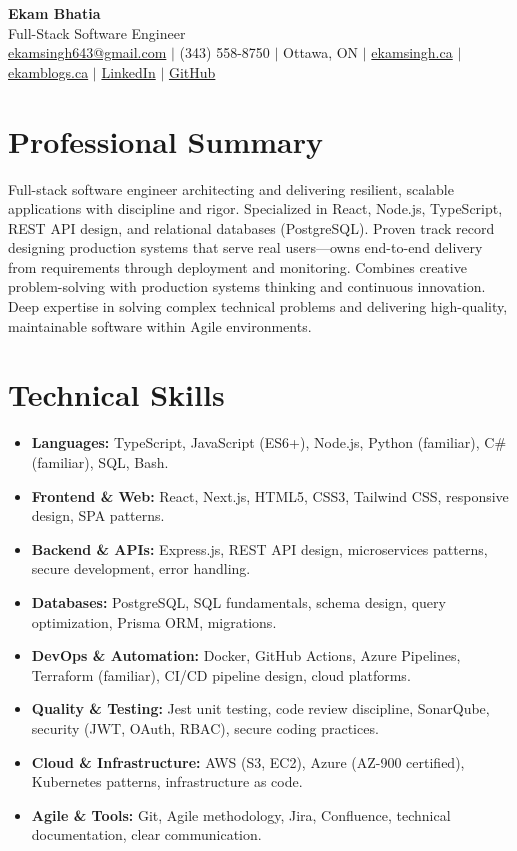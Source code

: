 \documentclass[11pt,a4paper]{article}
\begin{document}
\begin{center}
    {\LARGE \textbf{Ekam Bhatia}} \\
    \vspace{2pt}
    {\normalsize Full-Stack Software Engineer } \\
    \vspace{4pt}
    \small
    \href{mailto:ekamsingh643@gmail.com}{ekamsingh643@gmail.com} $|$
    (343) 558-8750 $|$ Ottawa, ON $|$
    \href{https://www.ekamsingh.ca}{ekamsingh.ca} $|$
    \href{https://www.ekamblogs.ca}{ekamblogs.ca} $|$
    \href{https://www.linkedin.com/in/ekam-bhatia-335840168}{LinkedIn} $|$
    \href{https://github.com/bhat0155}{GitHub}
\end{center}

\section{Professional Summary}
Full-stack software engineer architecting and delivering resilient, scalable applications with discipline and rigor. Specialized in React, Node.js, TypeScript, REST API design, and relational databases (PostgreSQL). Proven track record designing production systems that serve real users—owns end-to-end delivery from requirements through deployment and monitoring. Combines creative problem-solving with production systems thinking and continuous innovation. Deep expertise in solving complex technical problems and delivering high-quality, maintainable software within Agile environments.

\section{Technical Skills}
\begin{itemize}
    \item \textbf{Languages:} TypeScript, JavaScript (ES6+), Node.js, Python (familiar), C\# (familiar), SQL, Bash.
    \item \textbf{Frontend \& Web:} React, Next.js, HTML5, CSS3, Tailwind CSS, responsive design, SPA patterns.
    \item \textbf{Backend \& APIs:} Express.js, REST API design, microservices patterns, secure development, error handling.
    \item \textbf{Databases:} PostgreSQL, SQL fundamentals, schema design, query optimization, Prisma ORM, migrations.
    \item \textbf{DevOps \& Automation:} Docker, GitHub Actions, Azure Pipelines, Terraform (familiar), CI/CD pipeline design, cloud platforms.
    \item \textbf{Quality \& Testing:} Jest unit testing, code review discipline, SonarQube, security (JWT, OAuth, RBAC), secure coding practices.
    \item \textbf{Cloud \& Infrastructure:} AWS (S3, EC2), Azure (AZ-900 certified), Kubernetes patterns, infrastructure as code.
    \item \textbf{Agile \& Tools:} Git, Agile methodology, Jira, Confluence, technical documentation, clear communication.
\end{itemize}
\end{document}
